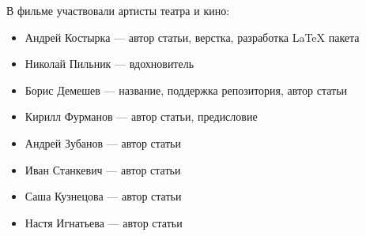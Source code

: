\documentclass[12pt]{article}
\begin{document}
\pagestyle{empty}


В фильме участвовали артисты театра и кино:

\begin{itemize}
\item Андрей Костырка --- автор статьи, верстка, разработка \LaTeX{} пакета
\item Николай Пильник --- вдохновитель
\item Борис Демешев --- название, поддержка репозитория, автор статьи
\item Кирилл Фурманов --- автор статьи, предисловие
\item Андрей Зубанов --- автор статьи
\item Иван Станкевич --- автор статьи
\item Саша Кузнецова --- автор статьи
\item Настя Игнатьева --- автор статьи
\end{itemize}
\end{document}
